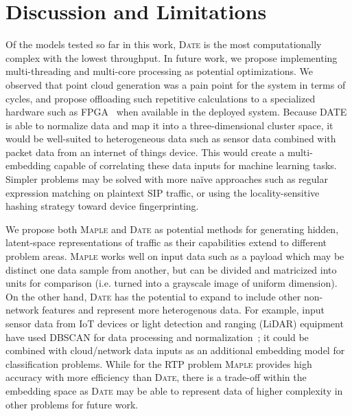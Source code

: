 \section{Discussion and Limitations}

Of the models tested so far in this work, \textsc{Date} is the most computationally complex with the lowest throughput. In future work, we propose implementing multi-threading and multi-core processing as potential optimizations. We observed that point cloud generation was a pain point for the system in terms of cycles, and propose offloading such repetitive calculations to a specialized hardware such as FPGA~\cite{Song2005EfficientPC} when available in the deployed system. Because DATE is able to normalize data and map it into a three-dimensional cluster space, it would be well-suited to heterogeneous data such as sensor data combined with packet data from an internet of things device. This would create a multi-embedding capable of correlating these data inputs for machine learning tasks. Simpler problems may be solved with more naïve approaches such as regular expression matching on plaintext SIP traffic, or using the locality-sensitive hashing strategy toward device fingerprinting.

We propose both \textsc{Maple} and \textsc{Date} as potential methods for generating hidden, latent-space representations of traffic as their capabilities extend to different problem areas. \textsc{Maple} works well on input data such as a payload which may be distinct one data sample from another, but can be divided and matricized into units for comparison (i.e. turned into a grayscale image of uniform dimension). On the other hand, \textsc{Date} has the potential to expand to include other non-network features and represent more heterogenous data. For example, input sensor data from IoT devices or light detection and ranging (LiDAR) equipment have used DBSCAN for data processing and normalization~\cite{wanglidar2019}; it could be combined with cloud/network data inputs as an additional embedding model for classification problems. While for the RTP problem \textsc{Maple} provides high accuracy with more efficiency than \textsc{Date}, there is a trade-off within the embedding space as \textsc{Date} may be able to represent data of higher complexity in other problems for future work.
